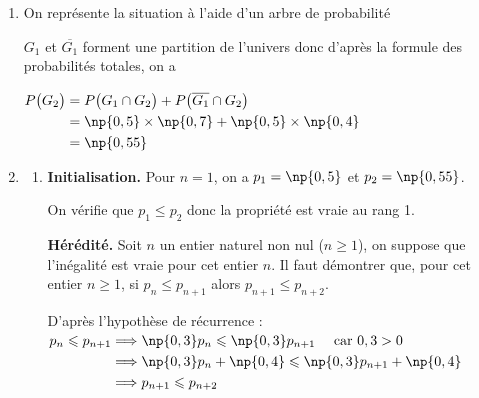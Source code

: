 	\begin{enumerate}
		\item On représente la situation à l'aide d'un arbre de probabilité
		\begin{center}
		\end{center}
		$G_1$ et $\overline{G_1}$ forment une partition de l'univers donc d'après la formule des probabilités totales, on a

		$\begin{aligned}[t] P\big( G_2 \big) &= P \big( G_1 \cap G_2 \big) + P \big( \overline{G_1} \cap G_2 \big)\\
		& = \np{0,5} \times \np{0,7} + \np{0,5} \times \np{0,4}\\
		& = \np{0,55}
		\end{aligned}$

		\item \begin{enumerate}
			\item \textbf{Initialisation.} Pour $n=1$, on a $p_1=\np{0,5}$ et $p_2=\np{0,55}$.

			On vérifie que $p_1 \leqslant p_2$ donc la propriété est vraie au rang 1.

			\textbf{Hérédité.} Soit $n$ un entier naturel non nul ($n\geqslant 1$), on suppose que l'inégalité est vraie pour cet entier $n$.
			Il faut démontrer que, pour cet entier $n \geqslant 1$, si $p_n \leqslant p_{n+1}$ alors $p_{n+1} \leqslant p_{n+2}$.

			D'après l'hypothèse de récurrence :\quad
			$\begin{aligned}[t] p_n \leqslant p_{n+1}
			& \Longrightarrow \np{0,3} p_n \leqslant \np{0,3} p_{n+1}\quad \text{ car }0,3 > 0\\
			& \Longrightarrow \np{0,3} p_n +\np{0,4} \leqslant \np{0,3} p_{n+1} + \np{0,4} \\
			& \Longrightarrow p_{n+1} \leqslant p_{n+2}
			\end{aligned}$


\end{enumerate}
\end{enumerate}

